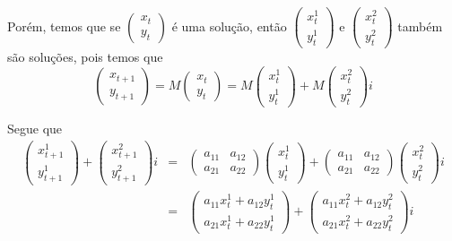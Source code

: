 Porém, temos que se $\left(\begin{array}{c} x_t \\ y_t \end{array}\right)$ é uma solução, então $\left(\begin{array}{c} x_t^1 \\ y_t^1 \end{array}\right)$
e $\left(\begin{array}{c} x_t^2 \\ y_t^2 \end{array}\right)$ também são soluções, 
pois temos que
$$
\left(\begin{array}{c} x_{t+1} \\ y_{t+1} \end{array}\right)
= M 
\left(\begin{array}{c} x_t \\ y_t \end{array}\right)
= M 
\left(\begin{array}{c} x_t^1 \\ y_t^1 \end{array}\right)
+ 
M \left(\begin{array}{c} x_t^2 \\ y_t^2 \end{array}\right)i
$$

Segue que
$$\begin{array}{rcl}
\left(\begin{array}{c} x_{t+1}^1 \\ y_{t+1}^1 \end{array}\right)
+ 
\left(\begin{array}{c} x_{t+1}^2 \\ y_{t+1}^2 \end{array}\right)i
&=&
\left(\begin{array}{cc} a_{11} & a_{12} \\ a_{21} & a_{22} \end{array}\right)
\left(\begin{array}{c} x_{t}^1 \\ y_{t}^1 \end{array}\right)
+
\left(\begin{array}{cc} a_{11} & a_{12} \\ a_{21} & a_{22} \end{array}\right)
\left(\begin{array}{c} x_{t}^2 \\ y_{t}^2 \end{array}\right)i \\
&=&
\left(\begin{array}{c} a_{11}x_{t}^1 + a_{12}y_{t}^1 \\ a_{21}x_{t}^1 + a_{22}y_{t}^1 \end{array}\right)
+
\left(\begin{array}{c} a_{11}x_{t}^2 + a_{12}y_{t}^2 \\ a_{21}x_{t}^2 + a_{22}y_{t}^2 \end{array}\right)i
\end{array}$$

